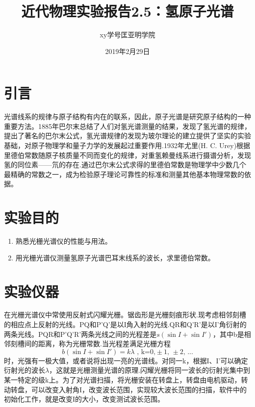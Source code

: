 \documentclass[a4paper]{article}
\title{近代物理实验报告2.5：氢原子光谱}
\author{xy\quad 学号\quad 匡亚明学院}
\date{2019年2月29日}
\begin{document}
\maketitle


\section{引言}
光谱线系的规律与原子结构有内在的联系，因此，原子光谱是研究原子结构的一种重要方法。1885年巴尔末总结了人们对氢光谱测量的结果，发现了氢光谱的规律，提出了著名的巴尔末公式，氢光谱规律的发现为玻尔理论的建立提供了坚实的实验基础，对原子物理学和量子力学的发展起过重要作用.1932年尤里(H. C. Urey)根据里德伯常数随原子核质量不同而变化的规律，对重氢赖曼线系进行摄谱分析，发现氢的同位素——氘的存在.通过巴尔末公式求得的里德伯常数是物理学中少数几个最精确的常数之一，成为检验原子理论可靠性的标准和测量其他基本物理常数的依据。


\section{实验目的}
\begin{enumerate}
\item 熟悉光栅光谱仪的性能与用法。
\item 用光栅光谱仪测量氢原子光谱巴耳末线系的波长，求里德伯常数。
\end{enumerate}

\section{实验仪器}
在光栅光谱仪中常使用反射式闪耀光栅。锯齿形是光栅刻痕形状.现考虑相邻刻槽的相应点上反射的光线。PQ和P'Q'是以I角入射的光线.QR和Q'R'是以I'角衍射的两条光线。PQR和P'Q'R'两条光线之间的光程差是$s(\sin I+\sin I')$，其中b是相邻刻槽间的距离，称为光栅常数.当光程差满足光栅方程
\begin{equation}
b(\sin I+\sin I') = k\lambda\text{ , k=0,}\pm\text{1, }\pm\text{2, ...}
\end{equation}
时，光强有一极大值，或者说将出现一亮的光谱线。对同一k，根据I、I'可以确定衍射光的波长$\lambda$，这就是光栅测量光谱的原理.闪耀光栅将同一波长的衍射光集中到某一特定的级k上。为了对光谱扫描，将光栅安装在转盘上，转盘由电机驱动，转动转盘，可以改变入射角I，改变波长范围，实现较大波长范围的扫描，软件中的初始化工作，就是改变I的大小，改变测试波长范围。
\end{document}
